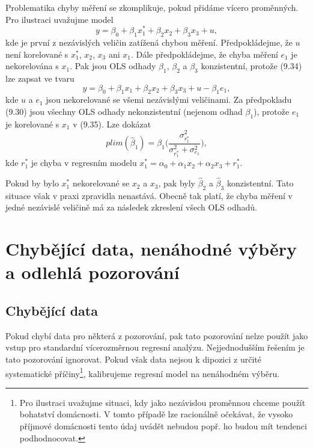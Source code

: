 Problematika chyby měření se zkomplikuje, pokud přidáme vícero proměnných. Pro ilustraci uvažujme model
\begin{equation}
y = \beta_0 + \beta_1 x_1^* + \beta_2 x_2 + \beta_3 x_3 + u,
\end{equation}
kde je první z nezávislých veličin zatížená chybou měření. Předpokládejme, že $u$ není korelované s $x_1^*$, $x_2$, $x_3$ ani $x_1$. Dále předpokládejme, že chyba měření $e_1$ je nekorelována s $x_1$. Pak jsou OLS odhady $\beta_1$, $\beta_2$ a $\beta_3$ konzistentní, protože (9.34) lze zapsat ve tvaru
\begin{equation}
y = \beta_0 + \beta_1 x_1 + \beta_2 x_2 + \beta_3 x_3 + u - \beta_1 e_1,
\end{equation}
kde $u$ a $e_1$ jsou nekorelované se všemi nezávislými veličinami. Za předpokladu (9.30) jsou všechny OLS odhady nekonzistentní (nejenom odhad $\beta_1$), protože $e_1$ je korelované s $x_1$ v (9.35). Lze dokázat
\begin{equation}
plim(\hat{\beta}_1) = \beta_1 \Big(\frac{\sigma^2_{r_1^*}}{\sigma_{r_1^*}^2 + \sigma_{e_1}^2}\Big),
\end{equation}
kde $r_1^*$ je chyba v regresním modelu $x_1^* = \alpha_0 + \alpha_1 x_2 + \alpha_2 x_3 + r_1^*$.

Pokud by bylo $x_1^*$ nekorelované se $x_2$ a $x_3$, pak byly $\hat{\beta}_2$ a $\hat{\beta}_3$ konzistentní. Tato situace však v praxi zpravidla nenastává. Obecně tak platí, že chyba měření v jedné nezávislé veličině má za následek zkreslení všech OLS odhadů.

\section{Chybějící data, nenáhodné výběry a odlehlá pozorování}

\subsection{Chybějící data}

Pokud chybí data pro některá z pozorování, pak tato pozorování nelze použít jako vstup pro standardní vícerozměrnou regresní analýzu. Nejjednodušším řešením je tato pozorování ignorovat. Pokud však data nejsou k dipozici z určité systematické příčiny\footnote{Pro ilustraci uvažujme situaci, kdy jako nezávislou proměnnou chceme použít bohatství domácnosti. V tomto případě lze racionálně očekávat, že vysoko příjmové domácnosti tento údaj uvádět nebudou popř. ho budou mít tendenci podhodnocovat.}, kalibrujeme regresní model na nenáhodném výběru.

